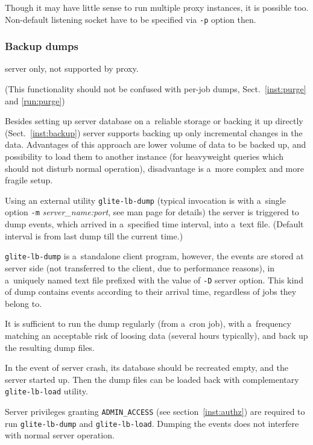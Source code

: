 Though it may have little sense to run multiple \LB proxy instances, it is possible too.
Non-default listening socket have to be specified via \verb'-p' option then.



\subsubsection{Backup dumps}
\label{run:dump}

\LB server only, not supported by proxy.

(This functionality should not be confused with per-job dumps, Sect.~\ref{inst:purge} and \ref{run:purge})

Besides setting up \LB server database on a~reliable storage or
backing it up directly (Sect.~\ref{inst:backup})
\LB server supports backing up only incremental changes in the data.
Advantages of this approach are lower volume of data to be backed up,
and possibility to load them to another instance (\eg for heavyweight
queries which should not disturb normal operation), disadvantage is
a~more complex and more fragile setup. 

Using an external utility \verb'glite-lb-dump' (typical invocation is with
a~single option \verb'-m' \emph{server\_name:port}, see man page for
details) the server is triggered to dump events, which arrived in
a~specified time interval, into a~text file. (Default interval is from last
dump till the current time.)

\verb'glite-lb-dump' is a~standalone client program, however, 
the events are stored at server side (\ie not transferred to the client,
due to performance reasons),
in a~uniquely named text
file prefixed with the value of \verb'-D' server option. This kind of dump
contains events according to their arrival time, regardless of jobs they belong
to.

It is sufficient to run the dump regularly (from a~cron job), with a~frequency
matching an acceptable risk of loosing data (several hours typically), and back
up the resulting dump files. 

In the event of server crash, its database should be recreated empty,
and the server started up.
Then the dump files can be loaded back with complementary
\verb'glite-lb-load' utility.

Server privileges granting \verb'ADMIN_ACCESS' (see section~\ref{inst:authz}) are required to run \verb'glite-lb-dump' and \verb'glite-lb-load'.
Dumping the events does not interfere with normal server operation.

